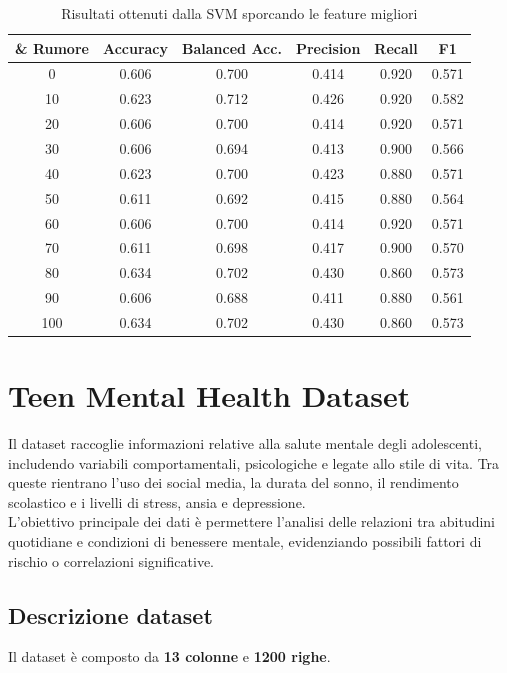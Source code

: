 \documentclass{article}
\begin{document}
\begin{table}[ht]
\centering
\begin{tabular}{cccccc}
\hline
\textbf{\& Rumore} & \textbf{Accuracy} & \textbf{Balanced Acc.} & \textbf{Precision} & \textbf{Recall} & \textbf{F1} \\
\hline
0   & 0.606 & 0.700 & 0.414 & 0.920 & 0.571 \\
10  & 0.623 & 0.712 & 0.426 & 0.920 & 0.582 \\
20  & 0.606 & 0.700 & 0.414 & 0.920 & 0.571 \\
30  & 0.606 & 0.694 & 0.413 & 0.900 & 0.566 \\
40  & 0.623 & 0.700 & 0.423 & 0.880 & 0.571 \\
50  & 0.611 & 0.692 & 0.415 & 0.880 & 0.564 \\
60  & 0.606 & 0.700 & 0.414 & 0.920 & 0.571 \\
70  & 0.611 & 0.698 & 0.417 & 0.900 & 0.570 \\
80  & 0.634 & 0.702 & 0.430 & 0.860 & 0.573 \\
90  & 0.606 & 0.688 & 0.411 & 0.880 & 0.561 \\
100 & 0.634 & 0.702 & 0.430 & 0.860 & 0.573 \\
\hline
\end{tabular}
\caption{Risultati ottenuti dalla SVM sporcando le feature migliori}
\label{tab:prestazioni_feature_migliori_SVM_liver}
\end{table}



\newpage


\section{Teen Mental Health Dataset}

Il dataset raccoglie informazioni relative alla salute mentale degli adolescenti, includendo variabili comportamentali, psicologiche e legate allo stile di vita. Tra queste rientrano l’uso dei social media, la durata del sonno, il rendimento scolastico e i livelli di stress, ansia e depressione.
\\
L’obiettivo principale dei dati è permettere l’analisi delle relazioni tra abitudini quotidiane e condizioni di benessere mentale, evidenziando possibili fattori di rischio o correlazioni significative.

\subsection{Descrizione dataset}
Il dataset è composto da \textbf{13 colonne} e \textbf{1200 righe}.
\end{document}
